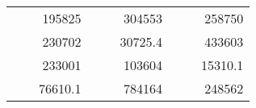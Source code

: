 \begin{table}[H]
\begin{tabular}{|ccrccrccc}
\rowcolor[HTML]{DAE8FC} 
\multicolumn{1}{|c|}{\cellcolor[HTML]{FFFFC7}}                                & \multicolumn{1}{c|}{\cellcolor[HTML]{DAE8FC}}                      & \multicolumn{1}{r|}{\cellcolor[HTML]{DAE8FC}195825}    & \multicolumn{1}{c|}{\cellcolor[HTML]{FFFFC7}}                                & \multicolumn{1}{c|}{\cellcolor[HTML]{DAE8FC}}                       & \multicolumn{1}{r|}{\cellcolor[HTML]{DAE8FC}304553}    & \multicolumn{1}{c|}{\cellcolor[HTML]{FFFFC7}}                                & \multicolumn{1}{c|}{\cellcolor[HTML]{DAE8FC}}                      & \multicolumn{1}{r|}{\cellcolor[HTML]{DAE8FC}258750}    \\ \cline{3-3} \cline{6-6} \cline{9-9} 
\multicolumn{1}{|c|}{\cellcolor[HTML]{FFFFC7}}                                & \multicolumn{1}{c|}{\cellcolor[HTML]{DAE8FC}}                      & \multicolumn{1}{r|}{\cellcolor[HTML]{DDFDFF}230702}    & \multicolumn{1}{c|}{\cellcolor[HTML]{FFFFC7}}                                & \multicolumn{1}{c|}{\cellcolor[HTML]{DAE8FC}}                       & \multicolumn{1}{r|}{\cellcolor[HTML]{DDFDFF}30725.4}   & \multicolumn{1}{c|}{\cellcolor[HTML]{FFFFC7}}                                & \multicolumn{1}{c|}{\cellcolor[HTML]{DAE8FC}}                      & \multicolumn{1}{r|}{\cellcolor[HTML]{DDFDFF}433603}    \\ \cline{3-3} \cline{6-6} \cline{9-9} 
\rowcolor[HTML]{DAE8FC} 
\multicolumn{1}{|c|}{\cellcolor[HTML]{FFFFC7}}                                & \multicolumn{1}{c|}{\cellcolor[HTML]{DAE8FC}}                      & \multicolumn{1}{r|}{\cellcolor[HTML]{DAE8FC}233001}    & \multicolumn{1}{c|}{\cellcolor[HTML]{FFFFC7}}                                & \multicolumn{1}{c|}{\cellcolor[HTML]{DAE8FC}}                       & \multicolumn{1}{r|}{\cellcolor[HTML]{DAE8FC}103604}    & \multicolumn{1}{c|}{\cellcolor[HTML]{FFFFC7}}                                & \multicolumn{1}{c|}{\cellcolor[HTML]{DAE8FC}}                      & \multicolumn{1}{r|}{\cellcolor[HTML]{DAE8FC}15310.1}   \\ \cline{3-3} \cline{6-6} \cline{9-9} 
\multicolumn{1}{|c|}{\cellcolor[HTML]{FFFFC7}}                                & \multicolumn{1}{c|}{\cellcolor[HTML]{DAE8FC}}                      & \multicolumn{1}{r|}{\cellcolor[HTML]{DDFDFF}76610.1}   & \multicolumn{1}{c|}{\cellcolor[HTML]{FFFFC7}}                                & \multicolumn{1}{c|}{\cellcolor[HTML]{DAE8FC}}                       & \multicolumn{1}{r|}{\cellcolor[HTML]{DDFDFF}784164}    & \multicolumn{1}{c|}{\cellcolor[HTML]{FFFFC7}}                                & \multicolumn{1}{c|}{\cellcolor[HTML]{DAE8FC}}                      & \multicolumn{1}{r|}{\cellcolor[HTML]{DDFDFF}248562}    \\ \cline{3-3} \cline{6-6} \cline{9-9} 

\end{tabular}
\end{table}

